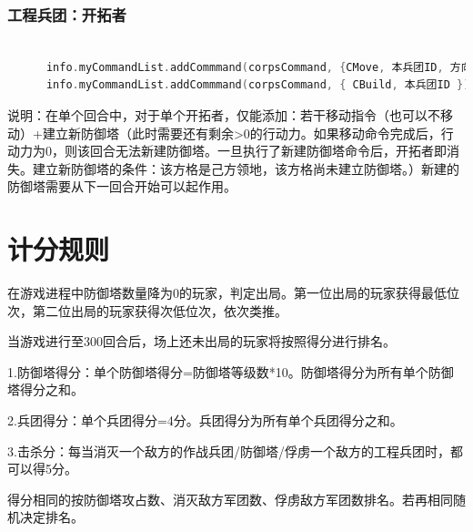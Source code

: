 \documentclass[a4paper,4pt]{article}
\begin{document}
\subsubsection{工程兵团：开拓者}
\begin{lstlisting}[language={C++}]  %插入代码块
          
      info.myCommandList.addCommmand(corpsCommand, {CMove, 本兵团ID, 方向(Cup / Cdown / Cleft / Cright)})  //移动
      info.myCommandList.addCommmand(corpsCommand, { CBuild, 本兵团ID })  //建立新防御塔
\end{lstlisting}
说明：在单个回合中，对于单个开拓者，仅能添加：若干移动指令（也可以不移动）+建立新防御塔（此时需要还有剩余>0的行动力。如果移动命令完成后，行动力为0，则该回合无法新建防御塔。一旦执行了新建防御塔命令后，开拓者即消失。建立新防御塔的条件：该方格是己方领地，该方格尚未建立防御塔。）新建的防御塔需要从下一回合开始可以起作用。

\section{计分规则}
在游戏进程中防御塔数量降为0的玩家，判定出局。第一位出局的玩家获得最低位次，第二位出局的玩家获得次低位次，依次类推。\par
当游戏进行至300回合后，场上还未出局的玩家将按照得分进行排名。\par
1.防御塔得分：单个防御塔得分=防御塔等级数*10。防御塔得分为所有单个防御塔得分之和。\par
2.兵团得分：单个兵团得分=4分。兵团得分为所有单个兵团得分之和。\par
3.击杀分：每当消灭一个敌方的作战兵团/防御塔/俘虏一个敌方的工程兵团时，都可以得5分。\par
得分相同的按防御塔攻占数、消灭敌方军团数、俘虏敌方军团数排名。若再相同随机决定排名。\par
\end{document}
